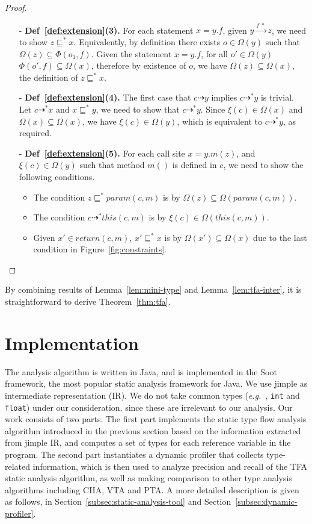 \documentclass{fac}
\newcommand\eg{\textit{e.g.\ }}
\newcommand{\VPT}{\Omega}
\newcommand{\HPT}{\Phi}
\newcommand{\less}{\sqsubseteq}
\newcommand{\tflow}{\dashrightarrow}
\newcommand{\hflow}{\longrightarrow}
\newcommand{\lhflow}[1]{\stackrel{#1}{\hflow}}
\begin{document}
\begin{proof}
\begin{itemize}
\item[-] \textbf{Def~\ref{def:extension}(3).} For each statement $x = y.f$, given $y\lhflow{f\ *}z$, we need to show $z\less^* x$. Equivalently, by definition there exists $o\in\VPT(y)$ such that $\VPT(z)\subseteq\HPT(o_1,f)$. Given the statement $x = y.f$, for all $o'\in \VPT(y)$ $\HPT(o',f)\subseteq\VPT(x)$, therefore by existence of $o$, we have $\VPT(z)\subseteq\VPT(x)$, the definition of $z\less^* x$.
\item[-] \textbf{Def~\ref{def:extension}(4).} The first case that $c\tflow y$ implies $c\tflow^* y$ is trivial. Let $c\tflow^* x$ and $x\less^*y$, we need to show that $c\tflow^*y$. Since $\xi(c)\in\VPT(x)$ and $\VPT(x)\subseteq\VPT(x)$, we have $\xi(c)\in\VPT(y)$, which is equivalent to $c\tflow^*y$, as required.

\item[-] \textbf{Def~\ref{def:extension}(5).} For each call site $x = y.m(z)$, and $\xi(c)\in\VPT(y)$ such that method $m()$ is defined in $c$, we need to show the following conditions.
      \begin{itemize}
      \item The condition $z\less^* param(c,m)$ is by $\VPT(z)\subseteq\VPT(param(c,m))$.
      \item The condition $c\tflow^*this(c,m)$ is by $\xi(c)\in\VPT(this(c,m))$.
      \item Given $x'\in return(c,m)$, $x'\less^* x$ is by $\VPT(x')\subseteq\VPT(x)$ due to the last condition in Figure~\ref{fig:constraints}.
      \end{itemize}
\end{itemize}
\end{proof}
By combining results of Lemma~\ref{lem:mini-type} and Lemma~\ref{lem:tfa-inter}, it is straightforward to derive Theorem~\ref{thm:tfa}.

\section{Implementation}\label{sec:implementation}
The analysis algorithm is written in Java, and is implemented in the Soot framework, the most popular static analysis framework for Java. We use jimple as intermediate representation (IR).
We do not take common types (\eg, \texttt{int} and \texttt{float}) under our consideration, since these are irrelevant to our analysis.
Our work consists of two parts. The first part implements the static type flow analysis algorithm introduced in the previous section based on the information extracted from jimple IR, and computes a set of types for each reference variable in the program. The second part instantiates a dynamic profiler that collects type-related information, which is then used to analyze precision and recall of the TFA static analysis algorithm, as well as making comparison to other type analysis algorithms including CHA, VTA and PTA. A more detailed description is given as follows, in Section~\ref{subsec:static-analysis-tool} and Section~\ref{subsec:dynamic-profiler}.
\end{document}
